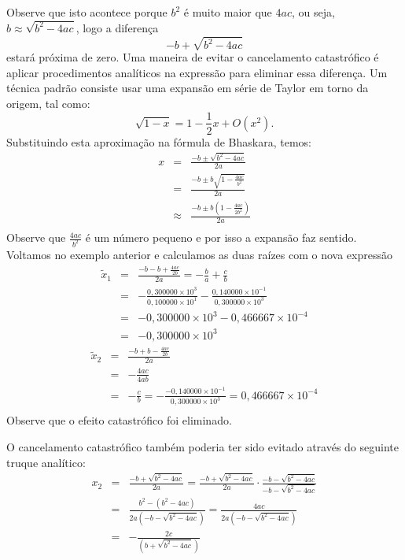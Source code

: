 \begin{ex}
Observe que isto acontece porque $b^2$ é muito maior que $4ac$, ou seja, $b\approx \sqrt{b^2-4ac}$, logo a diferença
\begin{equation}
  -b+\sqrt{b^2-4ac}
\end{equation}
estará próxima de zero. Uma maneira de evitar o cancelamento catastrófico é aplicar procedimentos analíticos na expressão para eliminar essa diferença. Um técnica padrão consiste usar uma expansão em série de Taylor em torno da origem, tal como:
\begin{equation}
\sqrt{1-x}=1-{\frac {1}{2}}x+O(x^2) .
\end{equation}
Substituindo esta aproximação na fórmula de Bhaskara, temos:
\begin{eqnarray}
x&=&\frac{-b\pm \sqrt{b^2-4ac}}{2a}\\
&=&\frac{-b\pm b\sqrt{1-\frac{4ac}{b^2}}}{2a}\\
&\approx&\frac{-b\pm b\left(1-\frac{4ac}{2b^2}\right)}{2a}\\
\end{eqnarray}
Observe que $\frac{4ac}{b^2}$ é um número pequeno e por isso a expansão faz sentido. Voltamos no exemplo anterior e calculamos as duas raízes com o nova expressão
\begin{eqnarray}
\tilde{x}_1&=& \frac{-b- b+\frac{4ac}{2b}}{2a} = -\frac{b}{a}+\frac{c}{b}\\
&=& -\frac{0,300000\times 10^{3}}{0,100000\times 10^{1}}-\frac{0,140000\times 10^{-1}}{0,300000\times 10^3}\\
&=& -0,300000\times 10^{3}-0,466667\times 10^{-4}\\
&=& -0,300000\times 10^{3}
\end{eqnarray}
\begin{eqnarray}
\tilde{x}_2&=& \frac{-b+ b-\frac{4ac}{2b}}{2a}\\
&=&-\frac{4ac}{4ab}\\
&=&-\frac{c}{b}=-\frac{-0,140000\times 10^{-1}}{0,300000\times 10^3}=0,466667\times 10^{-4}\\
\end{eqnarray}
Observe que o efeito catastrófico foi eliminado.
\end{ex}

\begin{obs} O cancelamento catastrófico também poderia ter sido evitado através do seguinte truque analítico:
\begin{eqnarray}
x_2&=& \frac{-b+ \sqrt{b^2-4ac} }{ 2a }=\frac{-b+ \sqrt{b^2-4ac} }{ 2a }\cdot \frac{ -b-\sqrt{b^2-4ac} }{ -b-\sqrt{b^2-4ac} }\\
&=& \frac{b^2-\left(b^2-4ac\right)}{2a\left(-b-\sqrt{b^2-4ac} \right)}=\frac{4ac}{2a\left(-b-\sqrt{b^2-4ac} \right)}\\
&=& -\frac{2c}{\left(b+\sqrt{b^2-4ac} \right)}
\end{eqnarray}

\end{obs}


